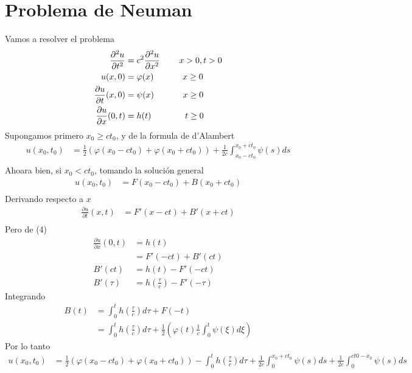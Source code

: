\documentclass[11pt]{book}
\theoremstyle{plain}
\theoremstyle{definition}
\begin{document}
\section{Problema de Neuman}
Vamos a resolver el problema
\setcounter{equation}{0}
\begin{align}
    \frac{\partial^2 u}{\partial t^2} &= c^2 \frac{\partial^2 u}{\partial x^2} \hspace{8mm} x > 0, t > 0\\ 
    u(x,0)&= \varphi(x) \hspace{12mm} x \geq 0\\
    \frac{\partial u}{\partial t}(x,0) &= \psi(x) \hspace{12mm} x \geq 0\\
    \frac{\partial u}{\partial x}(0,t) &= h(t) \hspace{14mm} t \geq 0
\end{align}
Supongamos primero $x_0\geq ct_0$, y de la formula de d'Alambert
\begin{align*}
    u(x_0,t_0) & = \frac{1}{2}\left( \varphi(x_0 - ct_0) + \varphi(x_0 + ct_0)\right) +\frac{1}{2c}\int_{x_0-ct_0}^{x_0+ct_0}\psi(s)ds\\
\end{align*}
Ahoara bien, si $x_0< ct_0$, tomando la solución general
\begin{align*}
    u(x_0,t_0) & = F(x_0-ct_0) + B(x_0+ct_0)\\
\end{align*}
Derivando respecto a $x$
\begin{align*}
    \frac{\partial u}{\partial t}(x,t) & = F'(x-ct) + B'(x+ct)\\
\end{align*}
Pero de (4)
\begin{align*}
    \frac{\partial u}{\partial x}(0,t) & = h(t)\\
    &= F'(-ct) + B'(ct)\\
    B'(ct) &= h(t) - F'(-ct)\\
    B'(\tau) &= h(\frac{\tau}{c}) - F'(-\tau)
\end{align*}
Integrando
\begin{align*}
    B(t) &= \int _{0}^{t}h(\frac{\tau}{c})d\tau + F(-t)\\
    &= \int _{0}^{t}h(\frac{\tau}{c})d\tau + \frac{1}{2}\left( \varphi(t) \frac{1}{c}\int_{0}^{t} \psi(\xi)d\xi\right)
\end{align*}
Por lo tanto
\begin{align*}
    u(x_0,t_0) & = \frac{1}{2}\left( \varphi(x_0 - ct_0) + \varphi(x_0 + ct_0)\right) -\int _{0}^{t}h(\frac{\tau}{c})d\tau + \frac{1}{2c}\int_{0}^{x_0+ct_0}\psi(s)ds+ \frac{1}{2c}\int_{0}^{ct0-x_0}\psi(s)ds\\
\end{align*}
\end{document}
